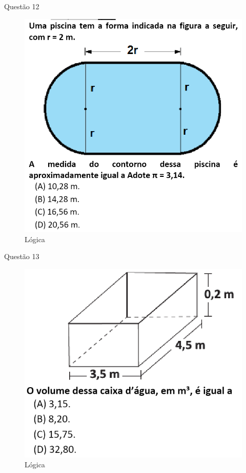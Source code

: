 \documentclass{beamer}
\begin{document}
\begin{frame}{Questão 12}
    \begin{figure}
        \caption{Lógica}
        \includegraphics[scale=0.45]{qst23.38.png}
    \end{figure}
\end{frame}
\begin{frame}{Questão 13}
    \begin{figure}
        \caption{Lógica}
        \includegraphics[scale=0.6]{qst23.54.png}
    \end{figure}
\end{frame}
\end{document}
